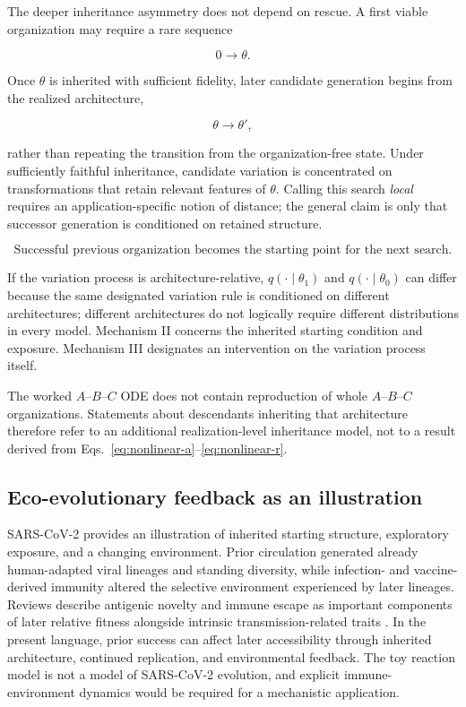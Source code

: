 \documentclass[11pt,a4paper]{article}
\begin{document}
The deeper inheritance asymmetry does not depend on rescue. A first viable organization may require a rare sequence

\[
0\longrightarrow\theta.
\]

Once $\theta$ is inherited with sufficient fidelity, later candidate generation begins from the realized architecture,

\[
\theta\longrightarrow\theta',
\]

rather than repeating the transition from the organization-free state. Under sufficiently faithful inheritance, candidate variation is concentrated on transformations that retain relevant features of $\theta$. Calling this search \emph{local} requires an application-specific notion of distance; the general claim is only that successor generation is conditioned on retained structure.

\[
\boxed{\text{Successful previous organization becomes the starting point for the next search.}}
\]

If the variation process is architecture-relative, $q(\cdot\mid\theta_1)$ and $q(\cdot\mid\theta_0)$ can differ because the same designated variation rule is conditioned on different architectures; different architectures do not logically require different distributions in every model. Mechanism II concerns the inherited starting condition and exposure. Mechanism III designates an intervention on the variation process itself.

The worked $A$--$B$--$C$ ODE does not contain reproduction of whole $A$--$B$--$C$ organizations. Statements about descendants inheriting that architecture therefore refer to an additional realization-level inheritance model, not to a result derived from Eqs.~\eqref{eq:nonlinear-a}--\eqref{eq:nonlinear-r}.

\subsection{Eco-evolutionary feedback as an illustration}

SARS-CoV-2 provides an illustration of inherited starting structure, exploratory exposure, and a changing environment. Prior circulation generated already human-adapted viral lineages and standing diversity, while infection- and vaccine-derived immunity altered the selective environment experienced by later lineages. Reviews describe antigenic novelty and immune escape as important components of later relative fitness alongside intrinsic transmission-related traits \citep{Carabelli2023}. In the present language, prior success can affect later accessibility through inherited architecture, continued replication, and environmental feedback. The toy reaction model is not a model of SARS-CoV-2 evolution, and explicit immune-environment dynamics would be required for a mechanistic application.
\end{document}
